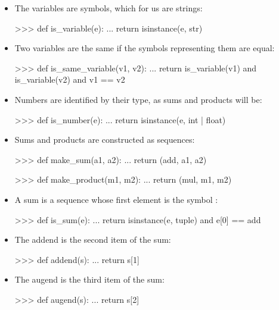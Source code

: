 \begin{itemize}
\item
The variables are symbols, which for us are strings:

\begin{codeBlock}
>>> def is_variable(e):
...     return isinstance(e, str)
\end{codeBlock}

\item
Two variables are the same if the symbols representing them are equal:

\begin{codeBlock}
>>> def is_same_variable(v1, v2):
...     return is_variable(v1) and is_variable(v2) and v1 == v2
\end{codeBlock}

\item
Numbers are identified by their type, as sums and products will be:

\begin{codeBlock}
>>> def is_number(e):
...     return isinstance(e, int | float)
\end{codeBlock}

\item
Sums and products are constructed as sequences:

\begin{codeBlock}
>>> def make_sum(a1, a2):
...     return (add, a1, a2)

>>> def make_product(m1, m2):
...     return (mul, m1, m2)
\end{codeBlock}

\item
A sum is a sequence whose first element is the symbol :

\begin{codeBlock}
>>> def is_sum(e):
...     return isinstance(e, tuple) and e[0] == add
\end{codeBlock}

\item
The addend is the second item of the sum:

\begin{codeBlock}
>>> def addend(s):
...     return s[1]
\end{codeBlock}

\item
The augend is the third item of the sum:

\begin{codeBlock}
>>> def augend(s):
...     return s[2]
\end{codeBlock}


\end{itemize}
